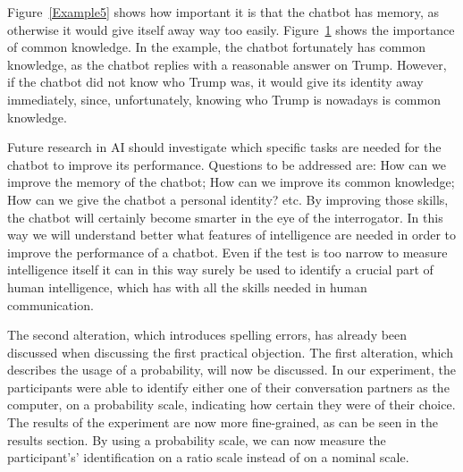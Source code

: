 Figure~\ref{Example5} shows how important it is that the chatbot has memory, as otherwise it would give itself away way too easily. Figure~\ref{Example6} shows the importance of common knowledge. In the example, the chatbot fortunately has common knowledge, as the chatbot replies with a reasonable answer on Trump. However, if the chatbot did not know who Trump was, it would give its identity away immediately, since, unfortunately, knowing who Trump is nowadays is common knowledge.

Future research in AI should investigate which specific tasks are needed for the chatbot to improve its performance. Questions to be addressed are: How can we improve the memory of the chatbot; How can we improve its common knowledge; How can we give the chatbot a personal identity? etc. By improving those skills, the chatbot will certainly become smarter in the eye of the interrogator. In this way we will understand better what features of intelligence are needed in order to improve the performance of a chatbot. Even if the test is too narrow to measure intelligence itself it can in this way surely be used to identify a crucial part of human intelligence, which has with all the skills needed in human communication.

\begin{figure}[ht]
   \begin{center}
   \end{center}
   \caption{}
   \label{Example6}
\end{figure}

The second alteration, which introduces spelling errors, has already been discussed when discussing the first practical objection. The first alteration, which describes the usage of a probability, will now be discussed. In our experiment, the participants were able to identify either one of their conversation partners as the computer, on a probability scale, indicating how certain they were of their choice. The results of the experiment are now more fine-grained, as can be seen in the results section. By using a probability scale, we can now measure the participant's' identification on a ratio scale instead of on a nominal scale.

